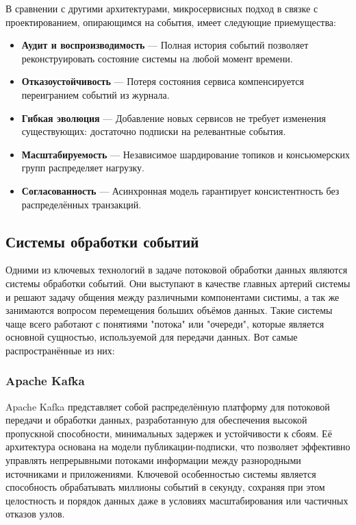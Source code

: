             
            В сравнении с другими архитектурами, микросервисных подход в связке с проектированием, опирающимся на события, имеет следующие приемущества:
            \begin{itemize}
                \item \textbf{Аудит и воспроизводимость} — Полная история событий позволяет реконструировать состояние системы на любой момент времени.
                \item \textbf{Отказоустойчивость} — Потеря состояния сервиса компенсируется переигранием событий из журнала.
                \item \textbf{Гибкая эволюция} — Добавление новых сервисов не требует изменения существующих: достаточно подписки на релевантные события.
                \item \textbf{Масштабируемость} — Независимое шардирование топиков и консьюмерских групп распределяет нагрузку.
                \item \textbf{Согласованность} — Асинхронная модель гарантирует консистентность без распределённых транзакций.
            \end{itemize}

    \subsection{Системы обработки событий}
        Одними из ключевых технологий в задаче потоковой обработки данных являются системы обработки событий. Они выступают в качестве главных артерий системы и решают задачу общения между различными компонентами систимы, а так же занимаются вопросом перемещения больших объёмов данных. Такие системы чаще всего работают с понятиями "потока" или "очереди", которые является основной сущностью, используемой для передачи данных. Вот самые распространённые из них:
        
        \subsubsection{Apache Kafka}
            Apache Kafka представляет собой распределённую платформу для потоковой передачи и обработки данных, разработанную для обеспечения высокой пропускной способности, минимальных задержек и устойчивости к сбоям. Её архитектура основана на модели публикации-подписки, что позволяет эффективно управлять непрерывными потоками информации между разнородными источниками и приложениями. Ключевой особенностью системы является способность обрабатывать миллионы событий в секунду, сохраняя при этом целостность и порядок данных даже в условиях масштабирования или частичных отказов узлов.
            
